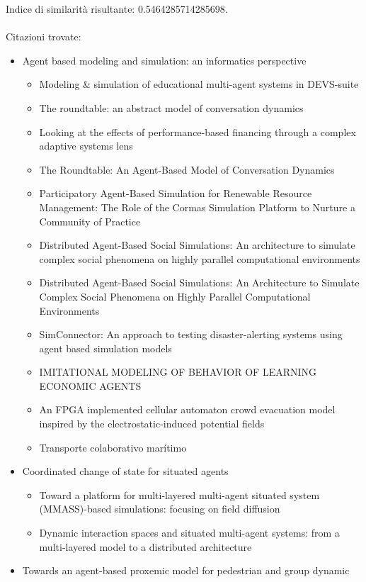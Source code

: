 \documentclass[12pt]{article}
\begin{document}
Indice di similarit\`a risultante: 0.5464285714285698. \\
\\
Citazioni trovate:
\begin{itemize}
\item Agent based modeling and simulation: an informatics perspective
\begin{itemize}
	\item Modeling \& simulation of educational multi-agent systems in DEVS-suite
	\item The roundtable: an abstract model of conversation dynamics
	\item Looking at the effects of performance-based financing through a complex adaptive systems lens
	\item The Roundtable: An Agent-Based Model of Conversation Dynamics
	\item Participatory Agent-Based Simulation for Renewable Resource Management: The Role of the Cormas Simulation Platform to Nurture a Community of Practice
	\item Distributed Agent-Based Social Simulations: An architecture to simulate complex social phenomena on highly parallel computational environments
	\item Distributed Agent-Based Social Simulations: An Architecture to Simulate Complex Social Phenomena on Highly Parallel Computational Environments
	\item SimConnector: An approach to testing disaster-alerting systems using agent based simulation models
	\item IMITATIONAL MODELING OF BEHAVIOR OF LEARNING ECONOMIC AGENTS
	\item An FPGA implemented cellular automaton crowd evacuation model inspired by the electrostatic-induced potential fields
	\item Transporte colaborativo marítimo
\end{itemize}
\item Coordinated change of state for situated agents
\begin{itemize}
	\item Toward a platform for multi-layered multi-agent situated system (MMASS)-based simulations: focusing on field diffusion
	\item Dynamic interaction spaces and situated multi-agent systems: from a multi-layered model to a distributed architecture
\end{itemize}
\item Towards an agent-based proxemic model for pedestrian and group dynamic

\end{itemize}
\end{document}
